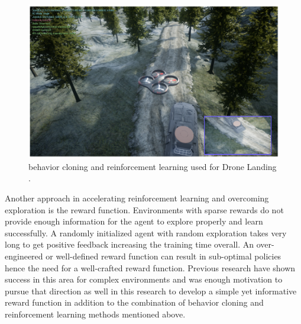 \begin{figure}[h!]
    \centering
    \includegraphics[width=\textwidth]{images/BCRL.png}
    \caption{behavior cloning and reinforcement learning used for Drone Landing \cite{goecks2020integrating}.}
    \label{fig:BCRL}
\end{figure}

Another approach in accelerating reinforcement learning and overcoming exploration is the reward function. Environments with sparse rewards do not provide enough information for the agent to explore properly and learn successfully. A randomly initialized agent with random exploration takes very long to get positive feedback increasing the training time overall. An over-engineered or well-defined reward function can result in sub-optimal policies hence the need for a well-crafted reward function. Previous research \cite{nagpal2020reward} \cite{Dewey2014ReinforcementLA} \cite{Konidaris2006AutonomousSK} have shown success in this area for complex environments and was enough motivation to pursue that direction as well in this research to develop a simple yet informative reward function in addition to the combination of behavior cloning and reinforcement learning methods mentioned above. \\

